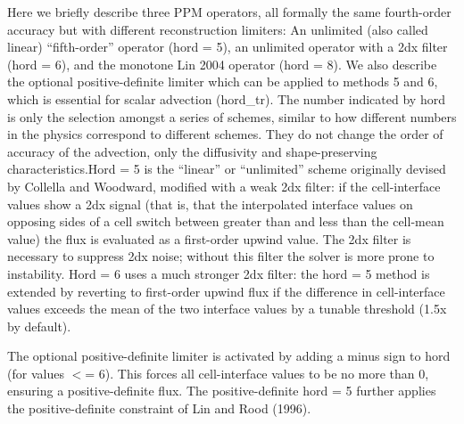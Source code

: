 Here we briefly describe three P\+PM operators, all formally the same fourth-\/order accuracy but with different reconstruction limiters\+: An unlimited (also called linear) “fifth-\/order” operator (hord = 5), an unlimited operator with a 2dx filter (hord = 6), and the monotone Lin 2004 operator (hord = 8). We also describe the optional positive-\/definite limiter which can be applied to methods 5 and 6, which is essential for scalar advection (hord\+\_\+tr). ​\+The number indicated by hord is only the selection amongst a series of schemes, ​similar to how different numbers in the physics correspond to different schemes. ​\+They do not change the order of accuracy of the advection, only the diffusivity and shape-\/preserving characteristics.\+Hord = 5 is the “linear” or “unlimited” scheme originally devised by Collella and Woodward, modified with a weak 2dx filter\+: if the cell-\/interface values show a 2dx signal (that is, that the interpolated interface values on opposing sides of a cell switch between greater than and less than the cell-\/mean value) the flux is evaluated as a first-\/order upwind value. The 2dx filter is necessary to suppress 2dx noise; without this filter the solver is more prone to instability. Hord = 6 uses a much stronger 2dx filter\+: the hord = 5 method is extended by reverting to first-\/order upwind flux if the difference in cell-\/interface values exceeds the mean of the two interface values by a tunable threshold (1.\+5x by default).

The optional positive-\/definite limiter is activated by adding a minus sign to hord (for values $<$= 6). This forces all cell-\/interface values to be no more than 0, ensuring a positive-\/definite flux. The positive-\/definite hord = 5 further applies the positive-\/definite constraint of Lin and Rood (1996). 
